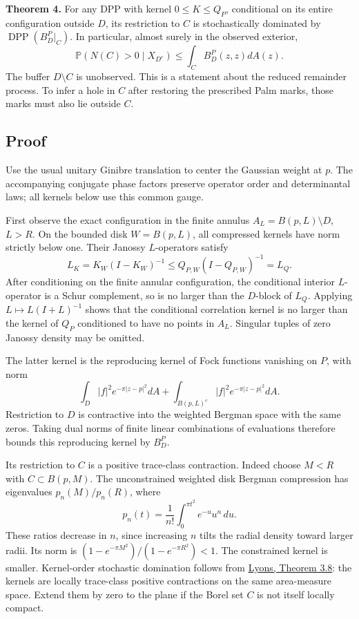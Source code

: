 \documentclass[11pt,a4paper]{article}
\theoremstyle{definition}
\theoremstyle{remark}
\numberwithin{equation}{section}
\begin{document}
\textbf{Theorem 4.} For any DPP with kernel \(0\le K\le Q_P\), conditional on its entire configuration outside \(D\), its restriction to \(C\) is stochastically dominated by \(\operatorname{DPP}(B_D^P|_C)\). In particular, almost surely in the observed exterior, \[
\mathbb P(N(C)>0\mid X_{D^c})
\le\int_C B_D^P(z,z)dA(z).
\tag{4.1}
\] The buffer \(D\setminus C\) is unobserved. This is a statement about the reduced remainder process. To infer a hole in \(C\) after restoring the prescribed Palm marks, those marks must also lie outside \(C\).

\hypertarget{proof-2}{%
\subsection{Proof}\label{proof-2}}

Use the usual unitary Ginibre translation to center the Gaussian weight at \(p\). The accompanying conjugate phase factors preserve operator order and determinantal laws; all kernels below use this common gauge.

First observe the exact configuration in the finite annulus \(A_L=B(p,L)\setminus D\), \(L>R\). On the bounded disk \(W=B(p,L)\), all compressed kernels have norm strictly below one. Their Janossy \(L\)-operators satisfy \[
L_K=K_W(I-K_W)^{-1}
\le Q_{P,W}(I-Q_{P,W})^{-1}=L_Q.
\] After conditioning on the finite annular configuration, the conditional interior \(L\)-operator is a Schur complement, so is no larger than the \(D\)-block of \(L_Q\). Applying \(L\mapsto L(I+L)^{-1}\) shows that the conditional correlation kernel is no larger than the kernel of \(Q_P\) conditioned to have no points in \(A_L\). Singular tuples of zero Janossy density may be omitted.

The latter kernel is the reproducing kernel of Fock functions vanishing on \(P\), with norm \[
\int_D |f|^2e^{-\pi|z-p|^2}dA
+\int_{B(p,L)^c}|f|^2e^{-\pi|z-p|^2}dA.
\] Restriction to \(D\) is contractive into the weighted Bergman space with the same zeros. Taking dual norms of finite linear combinations of evaluations therefore bounds this reproducing kernel by \(B_D^P\).

Its restriction to \(C\) is a positive trace-class contraction. Indeed choose \(M<R\) with \(C\subset B(p,M)\). The unconstrained weighted disk Bergman compression has eigenvalues \(p_n(M)/p_n(R)\), where \[
p_n(t)=\frac1{n!}\int_0^{\pi t^2}e^{-u}u^n\,du.
\] These ratios decrease in \(n\), since increasing \(n\) tilts the radial density toward larger radii. Its norm is \((1-e^{-\pi M^2})/(1-e^{-\pi R^2})<1\). The constrained kernel is smaller. Kernel-order stochastic domination follows from \href{https://arxiv.org/html/1406.2707v1}{Lyons, Theorem 3.8}: the kernels are locally trace-class positive contractions on the same area-measure space. Extend them by zero to the plane if the Borel set \(C\) is not itself locally compact.
\end{document}
